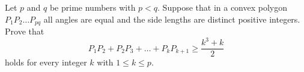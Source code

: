 \documentclass{article}
\begin{document}
\setlength{\parindent}{0pt}
Let \(\displaystyle p\) and \(\displaystyle q\) be prime numbers with \(\displaystyle p<q\). Suppose that in a convex polygon \(\displaystyle P_1P_2\dots P_{pq}\) all angles are equal and the side lengths are distinct positive integers. Prove that$$P_1P_2+P_2P_3+\dots+P_kP_{k+1}\geq \dfrac{k^3+k}2$$holds for every integer \(\displaystyle k\) with \(\displaystyle 1\le k\le p\).
\end{document}
